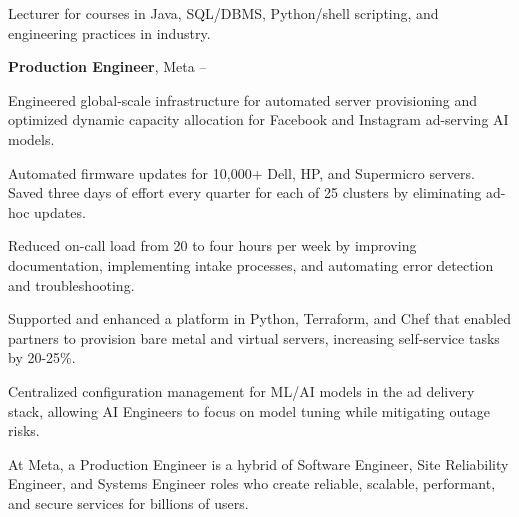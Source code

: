 \documentclass[MMMMyyyy,nonstopmode]{simpleresumecv_stacked}
\newcommand{\comment}[1]{\ignorespaces} %
\newif\ifLOCATION
\begin{document}
\begin{Body}
\ifLOCATION
\hfill 
Rochester, New York
\fi

\Gap
\begin{Detail}
Lecturer for courses in Java, SQL/DBMS, Python/shell scripting, and engineering practices in industry.
\end{Detail}

\BigGap
\fi

\Entry
\textbf{Production Engineer}, Meta
\hfill
{} -- 

\begin{Detail}

Engineered global-scale infrastructure for automated server provisioning and optimized dynamic capacity allocation for Facebook and Instagram ad-serving AI models.

\BulletItem
Automated firmware updates for 10,000+ Dell, HP, and Supermicro servers. 
Saved three days of effort every quarter for each of 25 clusters by eliminating ad-hoc updates.

\BulletItem
Reduced on-call load \comment{by 80\% (down to four hours per week)} from 20 to four hours per week by improving documentation, implementing intake processes, and automating error detection and troubleshooting.

\BulletItem
Supported and enhanced a platform in Python, Terraform, and Chef that enabled partners to provision bare metal and virtual servers, increasing self-service tasks by 20-25\%.

\BulletItem
Centralized configuration management for ML/AI models in the ad delivery stack, allowing AI Engineers to focus on model tuning while mitigating outage risks.

\iffalse 	%

At Meta, a Production Engineer is a hybrid of Software Engineer, Site Reliability Engineer, and Systems Engineer roles
who create reliable, scalable, performant, and secure services for billions of users.


\end{Detail}
\end{Body}
\end{document}
